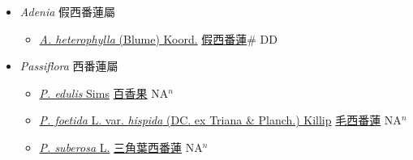 
  \begin{itemize}
 \item[] \textit{Adenia} 假西番蓮屬
                    
  \begin{itemize}
        \item[] \href{http://www.theplantlist.org/tpl1.1/search?q=Adenia+heterophylla}{\textit{A. heterophylla} (Blume) Koord.}     \href{\detokenize{http://taibnet.sinica.edu.tw/chi/taibnet_species_list.php?T2=假西番蓮&T2_new_value=true&fr=y}}{假西番蓮}\# DD
  \end{itemize}
 \item[] \textit{Passiflora} 西番蓮屬
                    
  \begin{itemize}
        \item[] \href{http://www.theplantlist.org/tpl1.1/search?q=Passiflora+edulis}{\textit{P. edulis} Sims}   \href{\detokenize{http://taibnet.sinica.edu.tw/chi/taibnet_species_list.php?T2=百香果&T2_new_value=true&fr=y}}{百香果} NA$^n$
        \item[] \href{http://www.theplantlist.org/tpl1.1/search?q=Passiflora+foetida+var.+hispida}{\textit{P. foetida} L. var. \textit{hispida} (DC. ex Triana \& Planch.) Killip}   \href{\detokenize{http://taibnet.sinica.edu.tw/chi/taibnet_species_list.php?T2=毛西番蓮&T2_new_value=true&fr=y}}{毛西番蓮} NA$^n$
        \item[] \href{http://www.theplantlist.org/tpl1.1/search?q=Passiflora+suberosa}{\textit{P. suberosa} L.}   \href{\detokenize{http://taibnet.sinica.edu.tw/chi/taibnet_species_list.php?T2=三角葉西番蓮&T2_new_value=true&fr=y}}{三角葉西番蓮} NA$^n$
  \end{itemize}
  \end{itemize}
